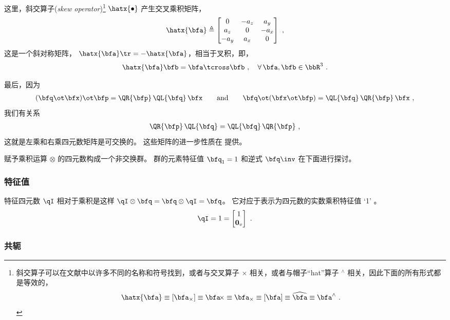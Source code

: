 %
这里，斜交算子(\emph{skew operator})\footnote{斜交算子可以在文献中以许多不同的名称和符号找到，或者与交叉算子 $\times$ 相关，或者与帽子“hat”算子 $^\wedge$ 相关，因此下面的所有形式都是等效的，
$$
\hatx{\bfa} \equiv [\bfa_\times] \equiv \bfa\!\times \equiv \bfa_\times \equiv [\bfa] \equiv \widehat{\bfa} \equiv \bfa^\wedge~.
$$
} 
%
$\hatx{\bullet}$ 产生交叉乘积矩阵，
%
\begin{align}
\hatx{\bfa} \triangleq \begin{bmatrix}
0 & -a_z & a_y \\
a_z & 0 & -a_x \\
-a_y & a_x & 0
\end{bmatrix}
\label{equ:skew}
~,
\end{align}
%
这是一个斜对称矩阵， $\hatx{\bfa}\tr=-\hatx{\bfa}$，相当于叉积，即， 
%
\begin{align}
\hatx{\bfa}\bfb = \bfa\tcross\bfb~,\quad \forall\, \bfa,\bfb\in\bbR^3 ~.  
\end{align}



最后，因为
%
\begin{align}
(\bfq\ot\bfx)\ot\bfp = \QR{\bfp}\,\QL{\bfq}\,\bfx 
\qquad \textrm{and} \qquad
\bfq\ot(\bfx\ot\bfp) = \QL{\bfq}\,\QR{\bfp}\,\bfx
~,
\end{align}
%
我们有关系
%
\begin{align}
\QR{\bfp}\,\QL{\bfq} = \QL{\bfq}\,\QR{\bfp}~,
\label{equ:PQ_commute}
\end{align}
%
这就是左乘和右乘四元数矩阵是可交换的。
这些矩阵的进一步性质在  提供。


赋予乘积运算 $\otimes$ 的四元数构成一个非交换群。 
群的元素特征值 $\bfq_1=1$ 和逆式 $\bfq\inv$ 在下面进行探讨。

\subsubsection{特征值}

特征四元数 $\qI$ 相对于乘积是这样 $\qI\otimes\bfq=\bfq\otimes\qI=\bfq$。
它对应于表示为四元数的实数乘积特征值 `1' 。
%
\begin{align*}
\qI = 1 = \begin{bmatrix}
1 \\ {\bf0}_v
\end{bmatrix} ~.
\end{align*}


\subsubsection{共轭}

